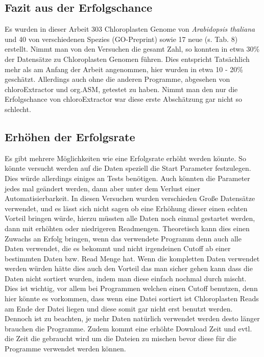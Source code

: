 \documentclass{scrartcl}
\begin{document}
\subsection{Fazit aus der Erfolgschance}
\label{sec-5-3}
Es wurden in dieser Arbeit 303 Chloroplasten Genome von \emph{Arabidopsis thaliana} und 40 von verschiedenen Spezies (GO-Preprint) sowie 17 neue (s. Tab. 8) erstellt. Nimmt man von den Versuchen die gesamt Zahl, so konnten in etwa 30\% der Datensätze zu Chloroplasten Genomen führen.
Dies entspricht Tatsächlich mehr als am Anfang der Arbeit angenommen, hier wurden in etwa 10 - 20\% geschätzt\footnotemark[42]{}. Allerdings auch ohne die anderen Programme, abgesehen von chloroExtractor und org.ASM, getestet zu haben. Nimmt man 
den nur die Erfolgschance von chloroExtractor war diese erste Abschätzung gar nicht so schlecht.   
\subsection{Erhöhen der Erfolgsrate}
\label{sec-5-4}
Es gibt mehrere Möglichkeiten wie eine Erfolgsrate erhöht werden könnte. So könnte versucht werden auf die Daten speziell die Start Parameter festzulegen. Dies würde allerdings einiges an Tests benötigen. 
Auch könnten die Parameter jedes mal 
geändert werden, dann aber unter dem Verlust einer Automatisierbarkeit. In diesen Versuchen wurden verschieden Große Datensätze verwendet, und es lässt sich nicht sagen ob eine Erhöhung dieser einen echten Vorteil bringen würde, 
hierzu müssten alle Daten noch einmal gestartet werden, dann mit erhöhten oder niedrigeren Readmengen. Theoretisch kann dies einen Zuwachs an Erfolg bringen, wenn das verwendete Programm denn auch alle Daten verwendet, 
die es bekommt und nicht
irgendeinen Cutoff ab einer bestimmten Daten bzw. Read Menge hat. Wenn die kompletten Daten verwendet werden würden hätte dies auch den Vorteil das man sicher gehen kann dass die Daten nicht sortiert wurden, indem man diese
einfach nochmal durch mischt. Dies ist wichtig, vor allem bei Programmen welchen einen Cutoff benutzen, denn hier könnte es vorkommen, dass wenn eine Datei sortiert ist Chloroplasten Reads am Ende der Datei liegen und diese somit
gar nicht erst benutzt werden. Dennoch ist zu beachten, je mehr Daten natürlich verwendet werden desto länger brauchen die Programme. Zudem kommt eine erhöhte Download Zeit und evtl. die Zeit die gebraucht wird um die Dateien zu 
mischen bevor diese für die Programme verwendet werden können. 
\end{document}
